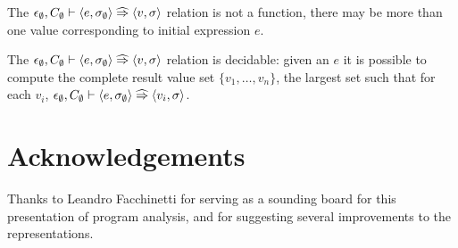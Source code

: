 \begin{lemma}[Nondeterminism] 
The $\epsilon_\emptyset, C_\emptyset \vdash \langle e , \sigma_\emptyset \rangle \mathrel{\widehat{\Rightarrow}} \langle v,\sigma\rangle$ relation is not a function, there may be more than one value corresponding to initial expression $e$.
\end{lemma}

\begin{lemma}[Decidability] 
The $\epsilon_\emptyset, C_\emptyset \vdash \langle  e , \sigma_\emptyset \rangle \mathrel{\widehat{\Rightarrow}} \langle v,\sigma\rangle$ relation is decidable: given an $e$ it is possible to compute the complete result value set $\{v_1,\dots,v_n\}$, the largest set such that for each $v_i$, $\epsilon_\emptyset, C_\emptyset \vdash \langle e, \sigma_\emptyset \rangle \mathrel{\widehat{\Rightarrow}} \langle v_i,\sigma\rangle$.
\end{lemma}




\section*{Acknowledgements}
Thanks to Leandro Facchinetti for serving as a sounding board for this presentation of program analysis, and for suggesting several improvements to the representations.




